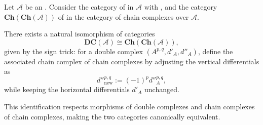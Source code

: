 \begin{theorem} \label{theorem:category_of_double_complexes_of_objects_of_an_additive_category_is_naturally_isomorphic_to_the_category_of_chain_complexes_of_chain_complexes}
Let $\mathcal{A}$ be an . Consider the category  of  in $\mathcal{A}$ with , and the category $\mathbf{Ch}(\mathbf{Ch}(\mathcal{A}))$ of  in the category of chain complexes over $\mathcal{A}$.

There exists a natural isomorphism of categories
$$ \mathbf{DC}(\mathcal{A}) \cong \mathbf{Ch}(\mathbf{Ch}(\mathcal{A})), $$
given by the sign trick: for a double complex $(A^{p,q}, d'_A, d''_A)$, define the associated chain complex of chain complexes by adjusting the vertical differentials as
$$ d''^{p,q}_{\mathrm{new}} := (-1)^p d''^{p,q}_A, $$
while keeping the horizontal differentials $d'_A$ unchanged.

This identification respects morphisms of double complexes and chain complexes of chain complexes, making the two categories canonically equivalent.
\end{theorem}